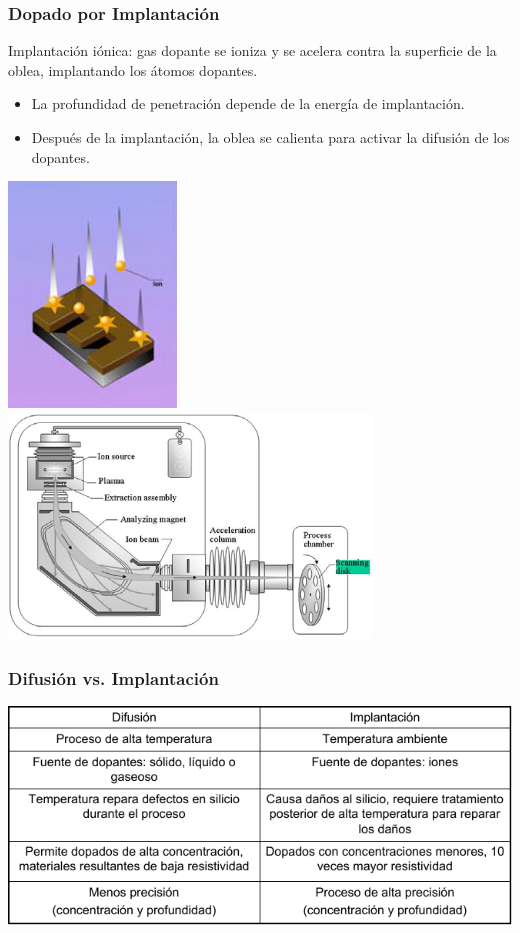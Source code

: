 \documentclass[aspectratio=169,10pt]{beamer}
\begin{document}
\begin{frame}
\frametitle{Dopado por Implantación}
Implantación iónica: gas dopante se ioniza y se acelera contra la superficie de la oblea, implantando los átomos dopantes.

\begin{itemize}
\item La profundidad de penetración depende de la energía de implantación. 
\item Después de la implantación, la oblea se calienta para activar la difusión de los dopantes.
\end{itemize}

\centering
\includegraphics[height=6cm]{doping-impl1}\includegraphics[height=6cm]{doping-impl2}
\end{frame}


\begin{frame}
\frametitle{Difusión vs. Implantación}
\centering
\includegraphics[width=14cm]{diff-vs-imp}
\end{frame}
\end{document}
